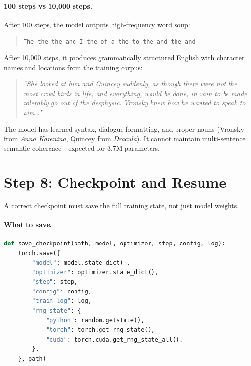 \paragraph{100 steps vs 10{,}000 steps.}

After 100 steps, the model outputs high-frequency word soup:

\begin{quote}
\small
\texttt{The the the and I the of a the to the and the and}
\end{quote}

After 10{,}000 steps, it produces grammatically structured English with character names and locations from the training corpus:

\begin{quote}
\small
\textit{``She looked at him and Quincey suddenly, as though there were not the most cruel birds in life, and everything, would be done, in vain to be made tolerably go out of the desphysic. Vronsky knew how he wanted to speak to him\ldots''}
\end{quote}

The model has learned syntax, dialogue formatting, and proper nouns (Vronsky from \emph{Anna Karenina}, Quincey from \emph{Dracula}).
It cannot maintain multi-sentence semantic coherence---expected for 3.7M parameters.


\section{Step 8: Checkpoint and Resume}
\label{sec:guide-resume}

A correct checkpoint must save the full training state, not just model weights.

\paragraph{What to save.}

\begin{lstlisting}[language=python, caption={Complete checkpoint}]
def save_checkpoint(path, model, optimizer, step, config, log):
    torch.save({
        "model": model.state_dict(),
        "optimizer": optimizer.state_dict(),
        "step": step,
        "config": config,
        "train_log": log,
        "rng_state": {
            "python": random.getstate(),
            "torch": torch.get_rng_state(),
            "cuda": torch.cuda.get_rng_state_all(),
        },
    }, path)
\end{lstlisting}

